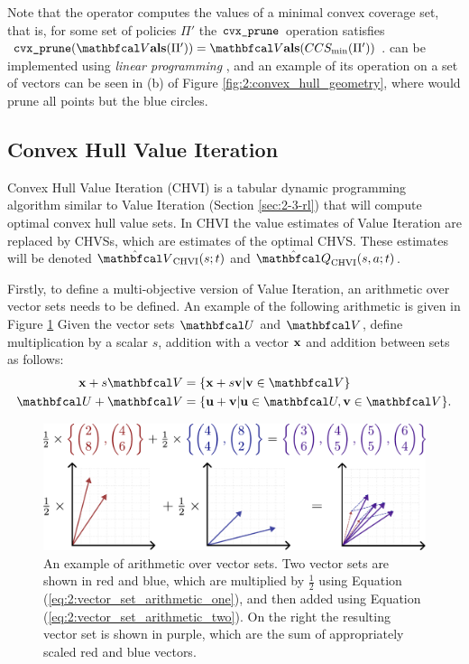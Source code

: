     Note that the \cprune\ewe operator computes the values of a minimal convex coverage set, that is, for some set of policies $\Pi'$ the ${\textnormal{\texttt{cvx\_prune}}}$ operation satisfies $\cprune(\valset(\Pi')) = \valset(CCS_{\min}(\Pi'))$. \cprune\ewe can be implemented using \textit{linear programming} \cite{cccs}, and an example of its operation on a set of vectors can be seen in (b) of Figure \ref{fig:2:convex_hull_geometry}, where \cprune\ewe would prune all points but the blue circles.




    \subsection{Convex Hull Value Iteration}
    \label{sec:2-5-1-chvi}

        Convex Hull Value Iteration (CHVI) \cite{chvi} is a tabular dynamic programming algorithm similar to Value Iteration (Section \ref{sec:2-3-rl}) that will compute optimal convex hull value sets. In CHVI the value estimates of Value Iteration are replaced by CHVSs, which are estimates of the optimal CHVS. These estimates will be denoted $\Vchvi(s;t)$ and $\Qchvi(s,a;t)$.

        Firstly, to define a multi-objective version of Value Iteration, an arithmetic over vector sets needs to be defined. An example of the following arithmetic is given in Figure \ref{fig:2:vectorset_arithmetic} Given the vector sets $\bfcl{U}$ and $\bfcl{V}$, define multiplication by a scalar $s$, addition with a vector $\mathbf{x}$ and addition between sets as follows:
        \begin{align}
            \bff{x} + s\bfcl{V} &= \{\bff{x} + s\bff{v} | \bff{v}\in\bfcl{V} \} \label{eq:2:vector_set_arithmetic_one} \\
            \bfcl{U} + \bfcl{V} &= \{ \bff{u}+\bff{v} | \bff{u}\in\bfcl{U}, \bff{v}\in\bfcl{V} \}. \label{eq:2:vector_set_arithmetic_two} 
        \end{align}

        \begin{figure}
            \centering\includegraphics[width=1.0\textwidth]{figures/ch2/ch_arithmetic.pdf} 
            \caption[An example of arithmetic over vector sets.]{An example of arithmetic over vector sets. Two vector sets are shown in red and blue, which are multiplied by $\frac{1}{2}$ using Equation (\ref{eq:2:vector_set_arithmetic_one}), and then added using Equation (\ref{eq:2:vector_set_arithmetic_two}). On the right the resulting vector set is shown in purple, which are the sum of appropriately scaled red and blue vectors.}
            \label{fig:2:vectorset_arithmetic}
        \end{figure}


